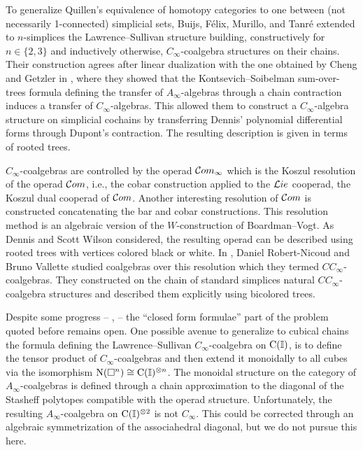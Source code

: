 To generalize Quillen's equivalence of homotopy categories to one between (not necessarily 1-connected) simplicial sets, Buijs, F{\'e}lix, Murillo, and Tanr{\'e} \cite{buijs2020liemodels} extended to $n$-simplices the Lawrence--Sullivan structure building, constructively for $n \in \{2,3\}$ and inductively otherwise, $C_\infty$-coalgebra structures on their chains.
Their construction agrees after linear dualization with the one obtained by Cheng and Getzler in \cite{getzler2008transfering}, where they showed that the Kontsevich--Soibelman sum-over-trees formula defining the transfer of $A_\infty$-algebras through a chain contraction induces a transfer of $C_\infty$-algebras.
This allowed them to construct a $C_\infty$-algebra structure on simplicial cochains by transferring Dennis' polynomial differential forms through Dupont's contraction.
The resulting description is given in terms of rooted trees.

$C_\infty$-coalgebras are controlled by the operad $\mathcal{C}om_\infty$ which is the Koszul resolution of the operad $\mathcal{C}om$, i.e., the cobar construction applied to the $\mathcal{L}ie$ cooperad, the Koszul dual cooperad of $\mathcal{C}om$.
Another interesting resolution of $\mathcal{C}om$ is constructed concatenating the bar and cobar constructions.
This resolution method is an algebraic version of the $W$-construction of Boardman--Vogt.
As Dennis and Scott Wilson considered, the resulting operad can be described using rooted trees with vertices colored black or white.
In \cite{vallette2020higherlietheory}, Daniel Robert-Nicoud and Bruno Vallette studied coalgebras over this resolution which they termed $CC_\infty$-coalgebras.
They constructed on the chain of standard simplices natural $CC_\infty$-coalgebra structures and described them explicitly using bicolored trees.

Despite some progress -- \cite{lawrence2019triangle, lawrence2021cells, buijs2019triangle}, \cite[\S6.5]{buijs2020liemodels} -- the ``closed form formulae'' part of the problem quoted before remains open.
One possible avenue to generalize to cubical chains the formula defining the Lawrence--Sullivan $C_\infty$-coalgebra on $\operatorname{C}(\mathbb{I})$, is to define the tensor product of $C_\infty$-coalgebras and then extend it monoidally to all cubes via the isomorphism $\operatorname{N}(\square^n) \cong \operatorname{C}(\mathbb{I})^{\otimes n}$.
The monoidal structure on the category of $A_\infty$-coalgebras is defined through a chain approximation to the diagonal of the Stasheff polytopes compatible with the operad structure.
Unfortunately, the resulting $A_\infty$-coalgebra on $\operatorname{C}(\mathbb{I})^{\otimes 2}$ is not $C_\infty$.
This could be corrected through an algebraic symmetrization of the associahedral diagonal, but we do not pursue this here.

